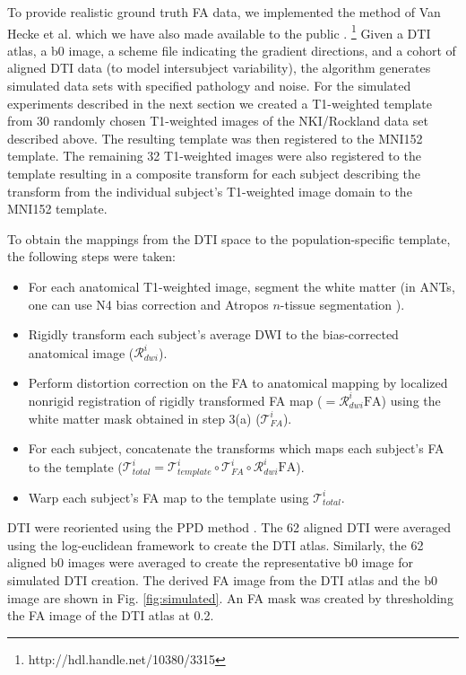 \documentclass[final,5p,times,twocolumn]{elsarticle}
\begin{document}
To provide realistic ground truth FA data, we implemented 
the method of Van Hecke et al. \cite{van-hecke2009} which 
we have also made available to the public
\cite{Tustison2011}.%
\footnote{
http://hdl.handle.net/10380/3315
}  
Given a DTI atlas, a b0 image, a scheme file indicating
the gradient directions, and 
a cohort of aligned DTI data (to model intersubject variability), the
algorithm generates
simulated data sets with specified pathology and noise.
For the simulated experiments described in the next section we
created a T1-weighted template from 30 randomly chosen T1-weighted images of
the NKI/Rockland data set described above.  
The resulting
template was then registered to the MNI152 template.  
The remaining 32 T1-weighted images were also registered to the
template resulting in a composite transform for each subject describing
the transform from the individual subject's T1-weighted image domain to 
the MNI152 template.  

To obtain the mappings from the DTI space to the population-specific
template, the following steps were taken:
\begin{itemize}
  \item For each anatomical T1-weighted image, segment the white matter (in ANTs, one can use N4 bias correction \citep{Tustison2010} and Atropos $n$-tissue segmentation \citep{Avants2011a}).
  \item Rigidly transform each subject's average DWI to the bias-corrected anatomical image ($\mathcal{R}^i_{dwi}$).
  \item Perform distortion correction on the FA to anatomical mapping 
        by localized nonrigid registration
        of rigidly transformed FA map ($=\mathcal{R}^i_{dwi} \mathrm{FA}$) using
        the white matter mask obtained in step 3(a) ($\mathcal{T}^i_{FA}$).
  \item For each subject, concatenate the transforms which maps each
        subject's FA to the template ($\mathcal{T}^i_{total} = \mathcal{T}^i_{template} \circ 
        \mathcal{T}^i_{FA} \circ \mathcal{R}^i_{dwi} \mathrm{FA}$).
  \item Warp each subject's FA map to the template using $\mathcal{T}^i_{total}$.  
\end{itemize}
DTI 
were reoriented using the PPD method \cite{alexander2001}.  The 62
aligned DTI were averaged using the log-euclidean framework 
\cite{arsigny2006} to create the DTI atlas.  Similarly, the 62 aligned
b0 images were averaged to create the representative b0 image
for simulated DTI creation.  The derived FA image from the DTI atlas and 
the b0 image are shown in 
Fig. \ref{fig:simulated}.  An FA mask was created by thresholding 
the FA image of the DTI atlas at 0.2.
\end{document}
